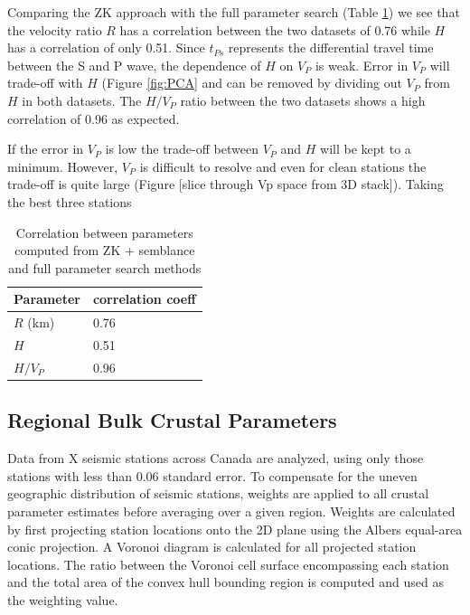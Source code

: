 \documentclass[draft, 12pt]{article}
\begin{document}
Comparing the ZK approach with the full parameter search (Table \ref{table:ZKvsFG}) we see that the velocity ratio $R$ has a correlation between the two datasets of 0.76 while $H$ has a correlation of only 0.51. Since $t_{Ps}$ represents the differential travel time between the S and P wave, the dependence of $H$ on $V_P$ is weak. Error in $V_P$ will trade-off with $H$ (Figure \ref{fig:PCA} and can be removed by dividing out $V_P$ from $H$ in both datasets. The $H/V_P$ ratio between the two datasets shows a high correlation of 0.96 as expected.

If the error in $V_P$ is low the trade-off between $V_P$ and $H$ will be kept to a minimum. However, $V_P$ is difficult to resolve and even for clean stations the trade-off is quite large (Figure [slice through Vp space from 3D stack]). Taking the best three stations

\begin{table}
  \begin{tabular}{ l l }
    \hline
    Parameter & correlation coeff \\
    \hline
    $R$ (km) &  0.76 \\
    $H$      &  0.51 \\
    $H/V_P$  &  0.96 \\
    \hline
  \end{tabular}
  \caption{Correlation between parameters computed from ZK + semblance and full parameter search methods}
\label{table:ZKvsFG}

\end{table}


\subsection{Regional Bulk Crustal Parameters}
Data from X seismic stations across Canada are analyzed, using only those stations with less than 0.06 standard error. To compensate for the uneven geographic distribution of seismic stations, weights are applied to all crustal parameter estimates before averaging over a given region. Weights are calculated by first projecting station locations onto the 2D plane using the Albers equal-area conic projection. A Voronoi diagram is calculated for all projected station locations. The ratio between the Voronoi cell surface encompassing each station and the total area of the convex hull bounding region is computed and used as the weighting value.
\end{document}

